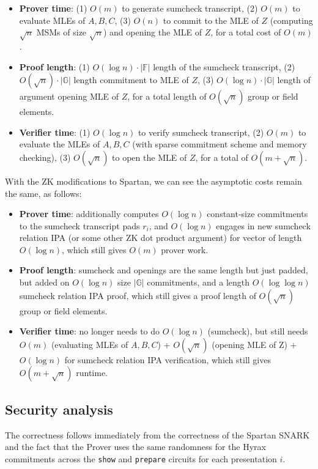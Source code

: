 \begin{itemize}
    \item \textbf{Prover time}: (1) $O(m)$ to generate sumcheck transcript, (2) $O(m)$ to evaluate MLEs of $A,B,C$, (3) $O(n)$ to commit to the MLE of $Z$ (computing $\sqrt{n}$ MSMs of size $\sqrt{n}$) and opening the MLE of $Z$, for a total cost of $O(m)$.
    \item \textbf{Proof length}: (1) $O(\log n) \cdot |\mathbb{F}|$ length of the sumcheck transcript, (2) $O(\sqrt{n}) \cdot |\mathbb{G}|$ length commitment to MLE of $Z$, (3) $O(\log n) \cdot |\mathbb{G}|$ length of argument opening MLE of $Z$, for a total length of $O(\sqrt{n})$ group or field elements.
    \item \textbf{Verifier time}: (1) $O(\log n)$ to verify sumcheck transcript, (2) $O(m)$ to evaluate the MLEs of $A,B,C$ (with sparse commitment scheme and memory checking), (3) $O(\sqrt{n})$ to open the MLE of $Z$, for a total of $O(m + \sqrt{n})$.
\end{itemize}

With the ZK modifications to Spartan, we can see the asymptotic costs remain the same, as follows:

\begin{itemize}
    \item \textbf{Prover time}: additionally computes $O(\log n)$ constant-size commitments to the sumcheck transcript pads $r_i$, and $O(\log n)$ engages in new sumcheck relation IPA (or some other ZK dot product argument) for vector of length $O(\log n)$, which still gives $O(m)$ prover work.
    \item \textbf{Proof length}: sumcheck and openings are the same length but just padded, but added on $O(\log n)$ size $|\mathbb{G}|$ commitments, and a length $O(\log\log n)$ sumcheck relation IPA proof, which still gives a proof length of $O(\sqrt n)$ group or field elements.
    \item \textbf{Verifier time}: no longer needs to do $O(\log n)$ (sumcheck), but still needs $O(m)$ (evaluating MLEs of $A,B,C$) + $O(\sqrt{n})$ (opening MLE of Z) + $O(\log n)$ for sumcheck relation IPA verification, which still gives $O(m + \sqrt{n})$ runtime.
\end{itemize}

\subsection{Security analysis}

The correctness follows immediately from the correctness of the Spartan SNARK and the fact that the Prover uses the same randomness for the Hyrax commitments across the \texttt{show} and \texttt{prepare} circuits for each presentation $i$.  


